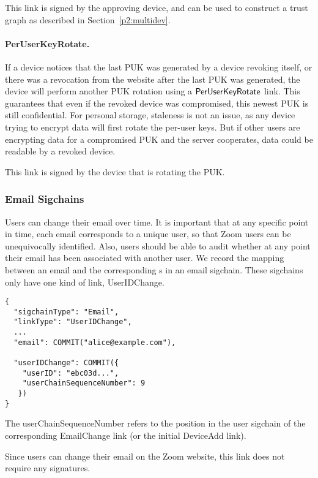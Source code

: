 This link is signed by the approving device, and can be used to construct a trust graph as described
in Section~\ref{p2:multidev}.

\paragraph{PerUserKeyRotate.} If a device notices that the last PUK was generated by a device
revoking itself, or there was a revocation from the website after the last PUK was generated, the
device will perform another PUK rotation using a $\mathsf{PerUserKeyRotate}{}$ link. This guarantees that
even if the revoked device was compromised, this newest PUK is still confidential. For personal
storage, staleness is not an issue, as any device trying to encrypt data will first rotate the
per-user keys. But if other users are encrypting data for a compromised PUK and the server
cooperates, data could be readable by a revoked device.

This link is signed by the device that is rotating the PUK.

\subsubsection{Email Sigchains}

Users can change their email over time. It is important that at any specific point in time, each email corresponds to a unique user, so that Zoom users can be unequivocally identified. Also,
users should be able to audit whether at any point their email has been associated with another
user. We record the mapping between an email and the corresponding {\userID}s in an email sigchain.
These sigchains only have one kind of link, \textsf{UserIDChange}.

\begingroup{}
\fontsize{10pt}{12pt}\selectfont{}
\begin{verbatim}
{
  "sigchainType": "Email",
  "linkType": "UserIDChange",
  ...
  "email": COMMIT("alice@example.com"),

  "userIDChange": COMMIT({
    "userID": "ebc03d...",
    "userChainSequenceNumber": 9
   })
}
\end{verbatim}
\endgroup{}

The \textsf{userChainSequenceNumber} refers to the position in the user sigchain of the corresponding
\textsf{EmailChange} link (or the initial \textsf{DeviceAdd} link).

Since users can change their email on the Zoom website, this link does not require any signatures.

